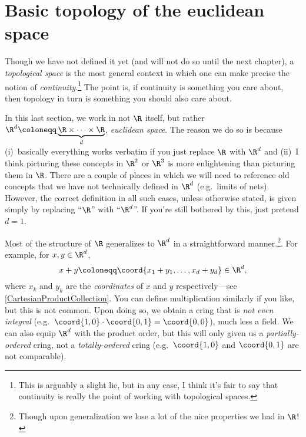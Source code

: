 \section{Basic topology of the euclidean space}

Though we have not defined it yet (and will not do so until the next chapter), a \emph{topological space} is the most general context in which one can make precise the notion of \emph{continuity}.\footnote{This is arguably a slight lie, but in any case, I think it's fair to say that continuity is really the point of working with topological spaces.}  The point is, if continuity is something you care about, then topology in turn is something you should also care about.

In this last section, we work in not $\R$ itself, but rather $\R ^d\coloneqq \underbrace{\R \times \cdots \times \R}_d$, \emph{euclidean space}.  The reason we do so is because (i)~basically everything works verbatim if you just replace $\R$ with $\R ^d$ and (ii)~I think picturing these concepts in $\R ^2$ or $\R ^3$ is more enlightening than picturing them in $\R$.  There are a couple of places in which we will need to reference old concepts that we have not technically defined in $\R ^d$ (e.g.~limits of nets).  However, the correct definition in all such cases, unless otherwise stated, is given simply by replacing ``$\R$'' with ``$\R ^d$''.  If you're still bothered by this, just pretend $d=1$.

Most of the structure of $\R$ generalizes to $\R ^d$ in a straightforward manner.\footnote{Though upon generalization we lose a lot of the nice properties we had in $\R$!}.  For example, for $x,y\in \R ^d$,
\begin{equation}
x+y\coloneqq \coord{x_1+y_1,\ldots ,x_d+y_d}\in \R ^d,
\end{equation}
where $x_k$ and $y_k$ are the \emph{coordinates} of $x$ and $y$ respectively---see \cref{CartesianProductCollection}.  You can define multiplication similarly if you like, but this is not common.  Upon doing so, we obtain a cring that is \emph{not even integral} (e.g.~$\coord{1,0}\cdot \coord{0,1}=\coord{0,0}$), much less a field.  We can also equip $\R ^d$ with the product order, but this will only given us a \emph{partially-ordered} cring, not a \emph{totally-ordered} cring (e.g.~$\coord{1,0}$ and $\coord{0,1}$ are not comparable).

